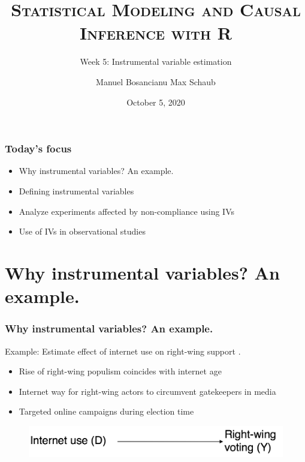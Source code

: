\documentclass[12pt,english,dvipsnames,aspectratio=169,handout]{beamer}\usepackage[]{graphicx}\usepackage[]{xcolor}
\title{\textsc{Statistical Modeling and Causal Inference with R}}
\subtitle{Week 5: Instrumental variable estimation}
\date{October 5, 2020}
\author{Manuel Bosancianu \hfill Max Schaub}
\institute{Hertie School of Governance}
\begin{document}
\maketitle


\begin{frame}
	\frametitle{Today's focus}
	\begin{itemize}
		\item Why instrumental variables? An example.
		\item Defining instrumental variables
		\item Analyze experiments affected by non-compliance using IVs
		\item Use of IVs in observational studies
	\end{itemize}
\end{frame}


\section{Why instrumental variables? An example.}

\begin{frame}
  \frametitle{Why instrumental variables? An example.}
  Example: Estimate effect of internet use on right-wing support \cite{schaub_voter_2020}.
	\begin{itemize} \scriptsize
		\item Rise of right-wing populism coincides with internet age
		\item Internet way for right-wing actors to circumvent gatekeepers in media
		\item Targeted online campaigns during election time
	\end {itemize}
	 \begin{figure} 
    \includegraphics[height=.07\textheight,keepaspectratio=true]{../04-figures/05/01-w5_dag_1.png}
    \end{figure}
\end{frame}
\end{document}
